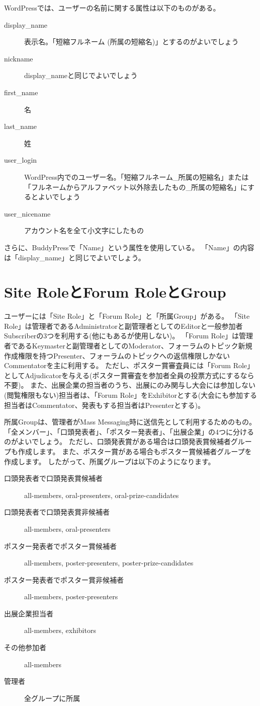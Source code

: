 \documentclass[titlepage,10pt,a4paper,uplatex]{jsbook}
\begin{document}
WordPressでは、ユーザーの名前に関する属性は以下のものがある。

\begin{description}
\item[display\_name] 表示名。「短縮フルネーム (所属の短縮名)」とするのがよいでしょう
\item[nickname] display\_nameと同じでよいでしょう
\item[first\_name] 名
\item[last\_name] 姓
\item[user\_login] WordPress内でのユーザー名。「短縮フルネーム\_所属の短縮名」または「フルネームからアルファベット以外除去したもの\_所属の短縮名」にするとよいでしょう
\item[user\_nicename] アカウント名を全て小文字にしたもの
\end{description}

さらに、BuddyPressで「Name」という属性を使用している。
「Name」の内容は「display\_name」と同じでよいでしょう。

\section{Site RoleとForum RoleとGroup}

ユーザーには「Site Role」と「Forum Role」と「所属Group」がある。
「Site Role」は管理者であるAdministratorと副管理者としてのEditorと一般参加者Subscriberの3つを利用する(他にもあるが使用しない)。
「Forum Role」は管理者であるKeymasterと副管理者としてのModerator、フォーラムのトピック新規作成権限を持つPresenter、フォーラムのトピックへの返信権限しかないCommentatorを主に利用する。
ただし、ポスター賞審査員には「Forum Role」としてAdjudicatorを与える(ポスター賞審査を参加者全員の投票方式にするなら不要)。
また、出展企業の担当者のうち、出展にのみ関与し大会には参加しない(閲覧権限もない)担当者は、「Forum Role」をExhibitorとする(大会にも参加する担当者はCommentator、発表もする担当者はPresenterとする)。

所属Groupは、管理者がMass Messaging時に送信先として利用するためのもの。
「全メンバー」、「口頭発表者」、「ポスター発表者」、「出展企業」の4つに分けるのがよいでしょう。
ただし、口頭発表賞がある場合は口頭発表賞候補者グループも作成します。
また、ポスター賞がある場合もポスター賞候補者グループを作成します。
したがって、所属グループは以下のようになります。

\begin{description}
\item[口頭発表者で口頭発表賞候補者] all-members, oral-presenters, oral-prize-candidates
\item[口頭発表者で口頭発表賞非候補者] all-members, oral-presenters
\item[ポスター発表者でポスター賞候補者] all-members, poster-presenters, poster-prize-candidates
\item[ポスター発表者でポスター賞非候補者] all-members, poster-presenters
\item[出展企業担当者] all-members, exhibitors
\item[その他参加者] all-members
\item[管理者] 全グループに所属
\end{description}
\end{document}
